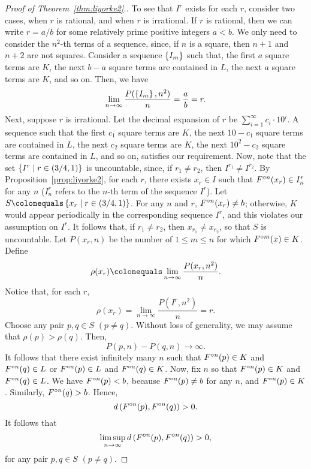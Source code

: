 \documentclass[12pt,draft,twoside]{book}
\begin{document}
\begin{proof}[Proof of Theorem~\ref{thm:liyorke2}.]
  To see that $I^r$ exists for each $r$, consider two cases, when $r$ is rational, and when $r$ is irrational.
  If $r$ is rational, then we can write $r = a/b$ for some relatively prime positive integers $a < b$.
  We only need to consider the $n^2$-th terms of a sequence, since, if $n$ is a square, then $n+1$ and $n+2$ are not squares.
  Consider a sequence $\left \{ I_m \right \}$ such that, the first $a$ square terms are $K$, the next $b-a$ square terms are contained in $L$, the next $a$ square terms are $K$, and so on.
  Then, we have
  \begin{equation*}
    \lim\limits_{n\to \infty}\frac{P(\left \{ I_m \right \},n^2)}{n} = \frac{a}{b} = r.
  \end{equation*}
  Next, suppose $r$ is irrational.
  Let the decimal expansion of $r$ be $\sum\limits_{i=1}^{\infty} c_i \cdot 10^i$.
  A sequence such that the first $c_1$ square terms are $K$, the next $10 - c_1$ square terms are contained in $L$, the next $c_2$ square terms are $K$, the next $10^2 - c_2$ square terms are contained in $L$, and so on, satisfies our requirement.
  Now, note that the set $\left \{ I^r \mathrel{} \middle| \mathrel{} r \in (3/4, 1) \right \}$ is uncountable, since, if $r_1 \neq r_2$, then $I^{r_1} \neq I^{r_2}$.
  By Proposition~\ref{prop:liyorke2}, for each $r$, there exists $x_r \in I$ such that $F^{\circ n}(x_r) \in I_n^r$ for any $n$ ($I_n^r$ refers to the $n$-th term of the sequence $I^r$).
  Let $S \ceq \setst{x_r}{r \in (3/4, 1)}$.
  For any $n$ and $r$, $F^{\circ n}(x_r) \neq b$; otherwise, $K$ would appear periodically in the corresponding sequence $I^r$, and this violates our assumption on $I^r$.
  It follows that, if $r_1 \neq r_2$, then $x_{r_1} \neq x_{r_2}$, so that $S$ is uncountable.
  Let $P(x_r, n)$ be the number of $1 \leq m \leq n$ for which $F^{\circ m}(x) \in K$.
  Define
  \begin{equation*}
    \rho(x_r) \ceq  \lim\limits_{n\to \infty}\frac{P(x_r,n^2)}{n}.
  \end{equation*}
  Notice that, for each $r$,
  \begin{equation*}
    \rho(x_r)
    = \lim\limits_{n\to \infty}\frac{P(I^r,n^2)}{n} 
    = r.
  \end{equation*}
  Choose any pair $p, q \in S$ $(p \neq q)$.
  Without loss of generality, we may assume that $\rho(p) > \rho(q)$.
  Then, 
  \begin{equation*}
    P(p, n) - P(q, n) \to \infty.
  \end{equation*}
  It follows that there exist infinitely many $n$ such that $F^{\circ n}(p) \in K$ and $F^{\circ n}(q) \in L$ or $F^{\circ n}(p) \in L$ and $F^{\circ n}(q) \in K$.
  Now, fix $n$ so that $F^{\circ n}(p) \in K$ and $F^{\circ n}(q) \in L$.
  We have $F^{\circ n}(p) < b$, because $F^{\circ n}(p) \neq b$ for any $n$, and $F^{\circ n}(p) \in K$.
  Similarly, $F^{\circ n}(q) > b$.
  Hence,
  \begin{equation*}
    d\left( F^{\circ n}(p), F^{\circ n}(q) \right) > 0.
  \end{equation*}
  It follows that
  \begin{equation*}
    \limsup\limits_{n \to \infty} d\left( F^{\circ n}(p), F^{\circ n}(q) \right) > 0,
  \end{equation*}
  for any pair $p, q \in S$ $(p \neq q)$.


\end{proof}
\end{document}
